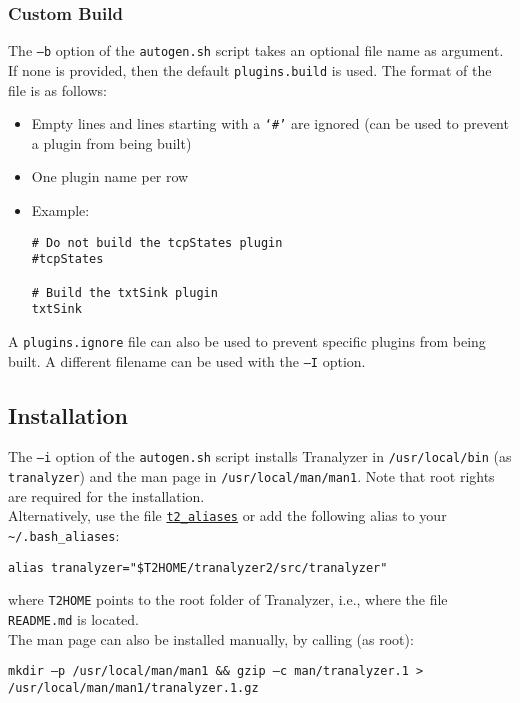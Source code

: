 \subsubsection{Custom Build}\label{autogenb}
The {\tt --b} option of the {\tt autogen.sh} script takes an optional file name as argument.
If none is provided, then the default {\tt plugins.build} is used.
The format of the file is as follows:
\begin{itemize}
    \item Empty lines and lines starting with a {\tt `\#'} are ignored (can be used to prevent a plugin from being built)
    \item One plugin name per row
    \item Example:
\begin{verbatim}
# Do not build the tcpStates plugin
#tcpStates

# Build the txtSink plugin
txtSink
\end{verbatim}
\end{itemize}

A {\tt plugins.ignore} file can also be used to prevent specific plugins from being built. A different filename can be used with the {\tt --I} option.

\subsection{Installation}\label{t2install}
The {\tt --i} option of the {\tt autogen.sh} script installs Tranalyzer in {\tt /usr/local/bin} (as {\tt tranalyzer}) and the man page in {\tt /usr/local/man/man1}. Note that root rights are required for the installation.\\

Alternatively, use the file \hyperref[s:aliases]{\tt t2\_aliases} or add the following alias to your {\tt \textasciitilde{}/.bash\_aliases}:

\begin{center}
{\tt alias tranalyzer="\$T2HOME/tranalyzer2/src/tranalyzer"}\\
\end{center}

where {\tt T2HOME} points to the root folder of Tranalyzer, i.e., where the file {\tt README.md} is located.\\

The man page can also be installed manually, by calling (as root):

\begin{center}
    {\tt mkdir --p /usr/local/man/man1 \&\& gzip --c man/tranalyzer.1 > /usr/local/man/man1/tranalyzer.1.gz}\\
\end{center}

